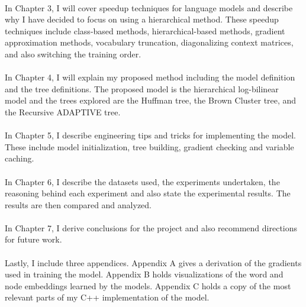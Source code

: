 \paragraph{}
In Chapter 3, I will cover speedup techniques for language models and describe why I have decided to focus on using a hierarchical method. These speedup techniques include class-based methods, hierarchical-based methods, gradient approximation methods, vocabulary truncation, diagonalizing context matrices, and also switching the training order.

\paragraph{}
In Chapter 4, I will explain my proposed method including the model definition and the tree definitions. The proposed model is the hierarchical log-bilinear model and the trees explored are the Huffman tree, the Brown Cluster tree, and the Recursive ADAPTIVE tree.

\paragraph{}
In Chapter 5, I describe engineering tips and tricks for implementing the model. These include model initialization, tree building, gradient checking and variable caching.

\paragraph{}
In Chapter 6, I describe the datasets used, the experiments undertaken, the reasoning behind each experiment and also state the experimental results. The results are then compared and analyzed. 

\paragraph{}
In Chapter 7, I derive conclusions for the project and also recommend directions for future work.

\paragraph{}
Lastly, I include three appendices. Appendix A gives a derivation of the gradients used in training the model. Appendix B holds visualizations of the word and node embeddings learned by the models. Appendix C holds a copy of the most relevant parts of my C++ implementation of the model.
